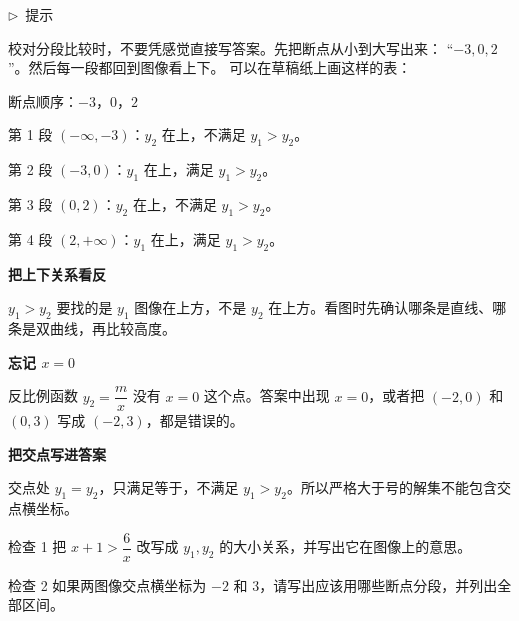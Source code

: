 \documentclass{exam-zh}
\newcommand{\edukai}{\kaishu}
\newcommand{\eduSubTitle}[1]{%
  \needspace{4\baselineskip}%
  \vspace{1mm}
  {\color{edu-blue}\bfseries #1}\par
  \vspace{1mm}
}
\newenvironment{eduAuxItem}[1]{%
  \needspace{4\baselineskip}%
  \vspace{2mm}
  \par\noindent
  \hangindent=8mm\hangafter=1
  {\color{edu-blue}\edukai $\triangleright$~#1}\enspace
  \begingroup
  \color{edu-ink}
  \edukai
}{%
  \endgroup
  \par
  \vspace{4mm}
}
\newcommand{\answerarea}[1][40mm]{%
  \vspace{3mm}%
  \begin{tcolorbox}[
    enhanced,
    breakable,
    colback=white,
    colframe=edu-line,
    boxrule=0.55pt,
    arc=0.8mm,
    height=#1,
    valign=top,
  ]
  \end{tcolorbox}%
}
\begin{document}
\begin{eduAuxItem}{提示}
校对分段比较时，不要凭感觉直接写答案。先把断点从小到大写出来：
“$-3,0,2$”。然后每一段都回到图像看上下。
可以在草稿纸上画这样的表：

断点顺序：$-3$，$0$，$2$

第 1 段 $(-\infty,-3)$：$y_2$ 在上，不满足 $y_1>y_2$。

第 2 段 $(-3,0)$：$y_1$ 在上，满足 $y_1>y_2$。

第 3 段 $(0,2)$：$y_2$ 在上，不满足 $y_1>y_2$。

第 4 段 $(2,+\infty)$：$y_1$ 在上，满足 $y_1>y_2$。
\end{eduAuxItem}




\begin{eduMistakeBox}
\eduSubTitle{把上下关系看反}$y_1>y_2$ 要找的是 $y_1$ 图像在上方，不是 $y_2$ 在上方。看图时先确认哪条是直线、哪条是双曲线，再比较高度。
\end{eduMistakeBox}




\begin{eduMistakeBox}
\eduSubTitle{忘记 $x=0$}反比例函数 $y_2=\dfrac{m}{x}$ 没有 $x=0$ 这个点。答案中出现 $x=0$，或者把 $(-2,0)$ 和 $(0,3)$ 写成 $(-2,3)$，都是错误的。
\end{eduMistakeBox}




\begin{eduMistakeBox}
\eduSubTitle{把交点写进答案}交点处 $y_1=y_2$，只满足等于，不满足 $y_1>y_2$。所以严格大于号的解集不能包含交点横坐标。
\end{eduMistakeBox}




\begin{eduVariationTraining}{检查 1}
把 $x+1>\dfrac{6}{x}$ 改写成 $y_1,y_2$ 的大小关系，并写出它在图像上的意思。
\answerarea[16mm]
\end{eduVariationTraining}




\begin{eduVariationTraining}{检查 2}
如果两图像交点横坐标为 $-2$ 和 $3$，请写出应该用哪些断点分段，并列出全部区间。
\answerarea[18mm]
\end{eduVariationTraining}
\end{document}
